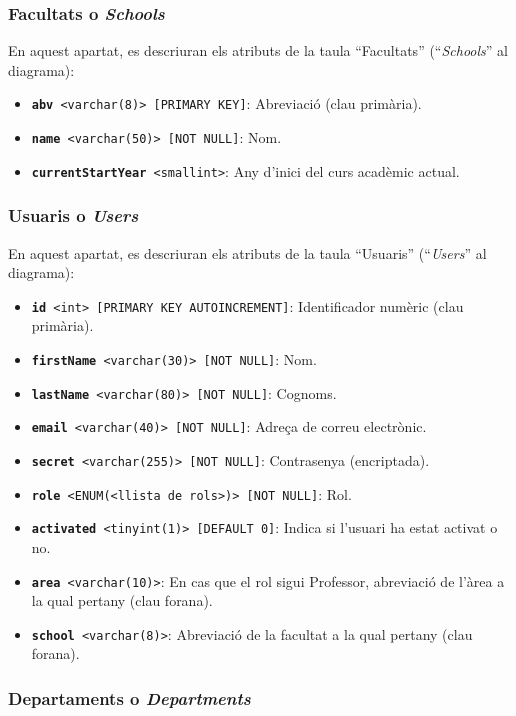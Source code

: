 \documentclass[a4paper,12pt]{ThesisStyle}
\begin{document}
\subsubsection{Facultats o \textit{Schools}}

En aquest apartat, es descriuran els atributs de la taula ``Facultats'' (``\textit{Schools}'' al diagrama):
\begin{itemize}
  \item \texttt{\textbf{abv} <varchar(8)> [PRIMARY KEY]}: Abreviació (clau primària).
  \item \texttt{\textbf{name} <varchar(50)> [NOT NULL]}: Nom.
  \item \texttt{\textbf{currentStartYear} <smallint>}: Any d'inici del curs acadèmic actual.
\end{itemize}

\subsubsection{Usuaris o \textit{Users}}

En aquest apartat, es descriuran els atributs de la taula ``Usuaris'' (``\textit{Users}'' al diagrama):
\begin{itemize}
  \item \texttt{\textbf{id} <int> [PRIMARY KEY AUTOINCREMENT]}: Identificador numèric (clau primària).
  \item \texttt{\textbf{firstName} <varchar(30)> [NOT NULL]}: Nom.
  \item \texttt{\textbf{lastName} <varchar(80)> [NOT NULL]}: Cognoms.
  \item \texttt{\textbf{email} <varchar(40)> [NOT NULL]}: Adreça de correu electrònic.
  \item \texttt{\textbf{secret} <varchar(255)> [NOT NULL]}: Contrasenya (encriptada).
  \item \texttt{\textbf{role} <ENUM(<llista de rols>)> [NOT NULL]}: Rol.
  \item \texttt{\textbf{activated} <tinyint(1)> [DEFAULT 0]}: Indica si l'usuari ha estat activat o no.
  \item \texttt{\textbf{area} <varchar(10)>}: En cas que el rol sigui Professor, abreviació de l'àrea a la qual pertany (clau forana).
  \item \texttt{\textbf{school} <varchar(8)>}: Abreviació de la facultat a la qual pertany (clau forana).
\end{itemize}

\subsubsection{Departaments o \textit{Departments}}
\end{document}
